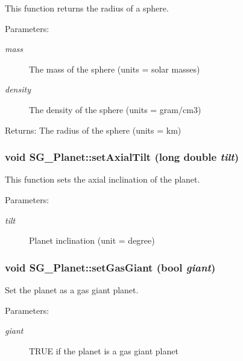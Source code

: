 This function returns the radius of a sphere. 

\begin{Desc}
\item[Parameters:]
\begin{description}
\item[{\em mass}]The mass of the sphere (units = solar masses) \item[{\em density}]The density of the sphere (units = gram/cm3) \end{description}
\end{Desc}
\begin{Desc}
\item[Returns:]The radius of the sphere (units = km) \end{Desc}
\subsubsection{\setlength{\rightskip}{0pt plus 5cm}void SG\_\-Planet::set\-Axial\-Tilt (long double {\em tilt})}\label{class_s_g___planet_a8}


This function sets the axial inclination of the planet. 

\begin{Desc}
\item[Parameters:]
\begin{description}
\item[{\em tilt}]Planet inclination (unit = degree) \end{description}
\end{Desc}
\subsubsection{\setlength{\rightskip}{0pt plus 5cm}void SG\_\-Planet::set\-Gas\-Giant (bool {\em giant})}\label{class_s_g___planet_a12}


Set the planet as a gas giant planet. 

\begin{Desc}
\item[Parameters:]
\begin{description}
\item[{\em giant}]TRUE if the planet is a gas giant planet \end{description}
\end{Desc}
